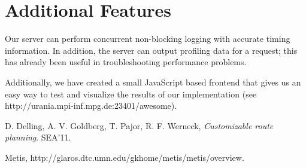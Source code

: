 \documentclass[a4paper]{article}
\begin{document}
\section{Additional Features}

Our server can perform concurrent non-blocking logging with accurate timing information.
In addition, the server can output profiling data for a request;
this has already been useful in troubleshooting performance problems.

Additionally, we have created a small JavaScript based frontend that 
gives us an easy way to test and visualize the results of our implementation
(see http://urania.mpi-inf.mpg.de:23401/awesome).

\begin{thebibliography}{9}
  
	D. Delling, A. V. Goldberg, T. Pajor, R. F. Werneck, \emph{Customizable route planning}. SEA'11. 
	
    Metis, http://glaros.dtc.umn.edu/gkhome/metis/metis/overview.

\end{thebibliography}
\end{document}
